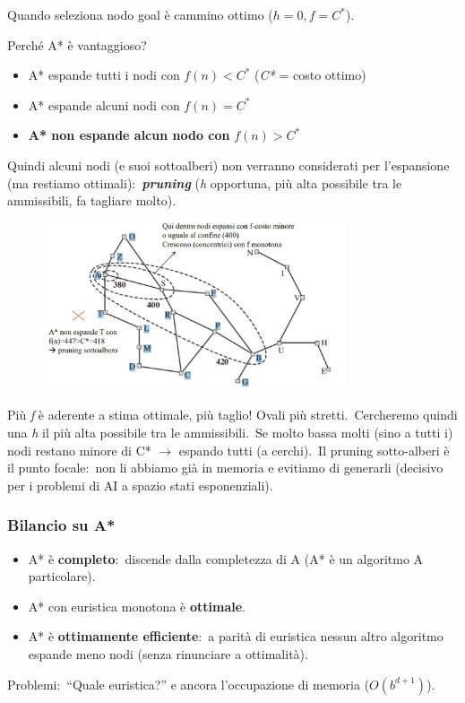 Quando seleziona nodo goal è cammino ottimo ($h=0, f=C^*$).

\vspace{12pt}

\noindent Perché A* è vantaggioso?
\begin{itemize}
	\item A* espande tutti i nodi con $f(n)<C^*$ (\textit{C*} = costo ottimo)
	\item A* espande alcuni nodi con $f(n) = C^*$
	\item \textbf{A* non espande alcun nodo con} $f(n) > C^*$
\end{itemize}
Quindi alcuni nodi (e suoi sottoalberi) non verranno considerati per l'espansione (ma restiamo ottimali):\ \textbf{\textit{pruning}} (\textit{h} opportuna, più alta possibile tra le ammissibili, fa tagliare molto).
\begin{figure}[H]
	\centering
	\includegraphics[width=0.8\textwidth]{immagini/Pruning.jpg}
\end{figure}
\noindent Più \textit{f} è aderente a stima ottimale, più taglio! Ovali più stretti.\ Cercheremo quindi una \textit{h} il più alta possibile tra le ammissibili.\
Se molto bassa molti (sino a tutti i) nodi restano minore di C* $\rightarrow$ espando tutti (a cerchi).\
Il pruning sotto-alberi è il punto focale:\ non li abbiamo già in memoria e evitiamo di generarli (decisivo per i problemi di AI a spazio stati esponenziali).

\subsubsection{Bilancio su A*}
\begin{itemize}
	\item A* è \textbf{completo}:\ discende dalla completezza di A (A* è un algoritmo A particolare).
	\item A* con euristica monotona è \textbf{ottimale}.
	\item A* è \textbf{ottimamente efficiente}:\ a parità di euristica nessun altro algoritmo espande meno nodi (senza rinunciare a ottimalità).
\end{itemize}
Problemi:\ ``Quale euristica?'' e ancora l'occupazione di memoria ($O(b^{d+1})$).

